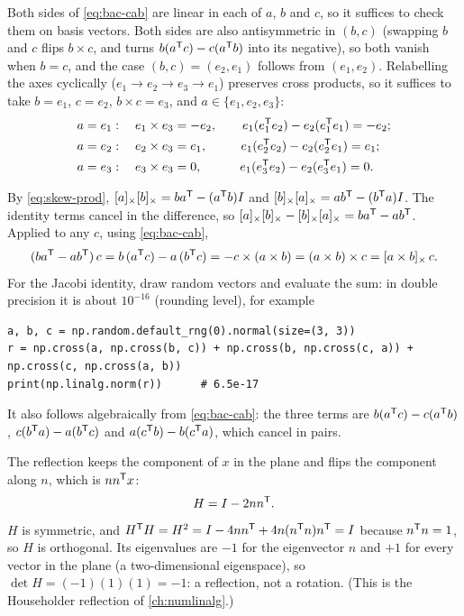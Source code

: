 \begin{solutions}
  \item Both sides of \eqref{eq:bac-cab} are linear in each of $a$, $b$ and $c$, so it suffices to check them on basis vectors.
        Both sides are also antisymmetric in $(b, c)$ (swapping $b$ and $c$ flips $b\times c$, and turns $b(a^{\mathsf{T}} c) - c(a^{\mathsf{T}} b)$
        into its negative), so both vanish when $b = c$, and the case $(b, c) = (e_2, e_1)$ follows from $(e_1, e_2)$.
        Relabelling the axes cyclically ($e_1 \to e_2 \to e_3 \to e_1$) preserves cross products, so it suffices to take
        $b = e_1$, $c = e_2$, $b \times c = e_3$, and $a \in \{e_1, e_2, e_3\}$:
        \begin{align*}
          a = e_1&:\quad e_1\times e_3 = -e_2, \qquad e_1(e_1^{\mathsf{T}} e_2) - e_2(e_1^{\mathsf{T}} e_1) = -e_2; \\
          a = e_2&:\quad e_2\times e_3 = e_1, \qquad\ \ e_1(e_2^{\mathsf{T}} e_2) - e_2(e_2^{\mathsf{T}} e_1) = e_1; \\
          a = e_3&:\quad e_3\times e_3 = 0, \qquad\ \ \ e_1(e_3^{\mathsf{T}} e_2) - e_2(e_3^{\mathsf{T}} e_1) = 0 .
        \end{align*}

  \item By \eqref{eq:skew-prod}, $[a]_{\times}[b]_{\times} = ba^{\mathsf{T}} - (a^{\mathsf{T}} b)I$ and $[b]_{\times}[a]_{\times} = ab^{\mathsf{T}} - (b^{\mathsf{T}} a)I$. The identity terms cancel in the
        difference, so $[a]_{\times}[b]_{\times} - [b]_{\times}[a]_{\times} = ba^{\mathsf{T}} - ab^{\mathsf{T}}$. Applied to any $c$, using \eqref{eq:bac-cab},
        \[
          (ba^{\mathsf{T}} - ab^{\mathsf{T}})\,c = b\,(a^{\mathsf{T}} c) - a\,(b^{\mathsf{T}} c) = -c \times (a \times b) = (a\times b)\times c = [a\times b]_{\times}\,c .
        \]
        For the Jacobi identity, draw random vectors and evaluate the sum: in double precision it is about $10^{-16}$
        (rounding level), for example
\begin{lstlisting}[style=py]
a, b, c = np.random.default_rng(0).normal(size=(3, 3))
r = np.cross(a, np.cross(b, c)) + np.cross(b, np.cross(c, a)) + np.cross(c, np.cross(a, b))
print(np.linalg.norm(r))      # 6.5e-17
\end{lstlisting}
        It also follows algebraically from \eqref{eq:bac-cab}: the three terms are $b(a^{\mathsf{T}} c) - c(a^{\mathsf{T}} b)$, $c(b^{\mathsf{T}} a) - a(b^{\mathsf{T}} c)$ and
        $a(c^{\mathsf{T}} b) - b(c^{\mathsf{T}} a)$, which cancel in pairs.

  \item The reflection keeps the component of $x$ in the plane and flips the component along $n$, which is $nn^{\mathsf{T}} x$:
        \[
          H = I - 2nn^{\mathsf{T}} .
        \]
        $H$ is symmetric, and $H^{\mathsf{T}} H = H^2 = I - 4nn^{\mathsf{T}} + 4n(n^{\mathsf{T}} n)n^{\mathsf{T}} = I$ because $n^{\mathsf{T}} n = 1$, so $H$ is orthogonal. Its eigenvalues are
        $-1$ for the eigenvector $n$ and $+1$ for every vector in the plane (a two-dimensional eigenspace), so
        $\det H = (-1)(1)(1) = -1$: a reflection, not a rotation. (This is the Householder reflection of \cref{ch:numlinalg}.)


\end{solutions}
